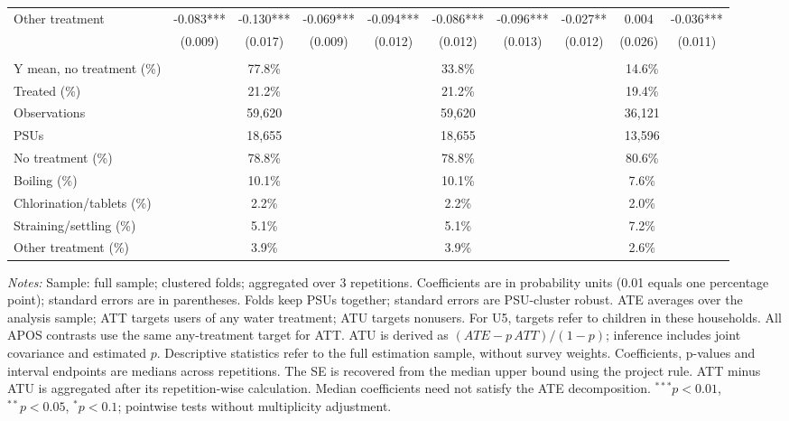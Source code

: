 \documentclass[10pt]{article}
\begin{document}
\begin{table}[H]
\begin{adjustbox}{max width=\linewidth}
\begin{tabular}{lccccccccc}
Other treatment & -0.083*** & -0.130*** & -0.069*** & -0.094*** & -0.086*** & -0.096*** & -0.027** & 0.004 & -0.036*** \\
 & (0.009) & (0.017) & (0.009) & (0.012) & (0.012) & (0.013) & (0.012) & (0.026) & (0.011) \\
\addlinespace[6pt]
\multicolumn{10}{l}{\textit{Descriptive statistics and sample}} \\
Y mean, no treatment (\%) & \multicolumn{3}{c}{77.8\%} & \multicolumn{3}{c}{33.8\%} & \multicolumn{3}{c}{14.6\%} \\
Treated (\%) & \multicolumn{3}{c}{21.2\%} & \multicolumn{3}{c}{21.2\%} & \multicolumn{3}{c}{19.4\%} \\
Observations & \multicolumn{3}{c}{59,620} & \multicolumn{3}{c}{59,620} & \multicolumn{3}{c}{36,121} \\
PSUs & \multicolumn{3}{c}{18,655} & \multicolumn{3}{c}{18,655} & \multicolumn{3}{c}{13,596} \\
No treatment (\%) & \multicolumn{3}{c}{78.8\%} & \multicolumn{3}{c}{78.8\%} & \multicolumn{3}{c}{80.6\%} \\
Boiling (\%) & \multicolumn{3}{c}{10.1\%} & \multicolumn{3}{c}{10.1\%} & \multicolumn{3}{c}{7.6\%} \\
Chlorination/tablets (\%) & \multicolumn{3}{c}{2.2\%} & \multicolumn{3}{c}{2.2\%} & \multicolumn{3}{c}{2.0\%} \\
Straining/settling (\%) & \multicolumn{3}{c}{5.1\%} & \multicolumn{3}{c}{5.1\%} & \multicolumn{3}{c}{7.2\%} \\
Other treatment (\%) & \multicolumn{3}{c}{3.9\%} & \multicolumn{3}{c}{3.9\%} & \multicolumn{3}{c}{2.6\%} \\
\hline\hline
\end{tabular}
\end{adjustbox}
\par\vspace{3pt}
\begin{minipage}{\linewidth}\scriptsize \textit{Notes:} Sample: full sample; clustered folds; aggregated over 3 repetitions. Coefficients are in probability units (0.01 equals one percentage point); standard errors are in parentheses. Folds keep PSUs together; standard errors are PSU-cluster robust. ATE averages over the analysis sample; ATT targets users of any water treatment; ATU targets nonusers. For U5, targets refer to children in these households. All APOS contrasts use the same any-treatment target for ATT. ATU is derived as $(ATE-p\,ATT)/(1-p)$; inference includes joint covariance and estimated $p$. Descriptive statistics refer to the full estimation sample, without survey weights. Coefficients, p-values and interval endpoints are medians across repetitions. The SE is recovered from the median upper bound using the project rule. ATT minus ATU is aggregated after its repetition-wise calculation. Median coefficients need not satisfy the ATE decomposition. $^{***}p<0.01$, $^{**}p<0.05$, $^{*}p<0.1$; pointwise tests without multiplicity adjustment.\end{minipage}
\end{table}
\end{document}
